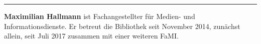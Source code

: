 \begin{center}\rule{0.5\linewidth}{\linethickness}\end{center}

\textbf{Maximilian Hallmann} ist Fachangestellter für Medien- und
Informationsdienste. Er betreut die Bibliothek seit November 2014,
zunächst allein, seit Juli 2017 zusammen mit einer weiteren FaMI.
